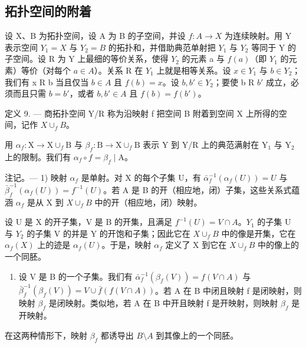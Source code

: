 \subsection{拓扑空间的附着}

设 X、B 为拓扑空间，设 A 为 B 的子空间，并设 \(f: A \rightarrow X\) 为连续映射。用 Y 表示空间 \(Y_{1} = X\) 与 \(Y_{2} = B\) 的拓扑和，并借助典范单射把 \(Y_{1}\) 与 \(Y_{2}\) 等同于 Y 的子空间。设 R 为 Y 上最细的等价关系，使得 \(Y_{2}\) 的元素 a 与 \(f(a)\)（即 \(Y_{1}\) 的元素）等价（对每个 \(a \in A\)）。关系 R 在 \(Y_{1}\) 上就是相等关系。设 \(x \in Y_{1}\) 与 \(b \in Y_{2}\)；我们有 x R b 当且仅当 \(b \in A\) 且 \(f(b) = x\)。设 \(b, b' \in Y_{2}\)；要使 b R \(b'\) 成立，必须而且只需 \(b = b'\)，或者 \(b, b' \in A\) 且 \(f(b) = f(b')\)。

定义 9. --- 商拓扑空间 Y/R 称为沿映射 f 把空间 B 附着到空间 X 上所得的空间，记作 \(X \cup_{f} B\)。

用 \(\alpha_{f}\colon\mathrm{X}\to\mathrm{X}\cup_{f}\mathrm{B}\) 与 \(\beta_{f}\colon\mathrm{B}\to\mathrm{X}\cup_{f}\mathrm{B}\) 表示 Y 到 Y/R 上的典范满射在 \(\mathrm{Y}_{1}\) 与 \(\mathrm{Y}_{2}\) 上的限制。我们有 \(\alpha_{f}\circ f=\beta_{f}\mid\mathrm{A}\)。

注记。--- 1) 映射 \(\alpha_{f}\) 是单射。对 X 的每个子集 U，有 \(\bar{\alpha}_{f}^{-1}(\alpha_{f}(U)) = U\) 与 \(\bar{\beta}_{f}^{-1}(\alpha_{f}(U)) = f^{-1}(U)\)。若 A 是 B 的开（相应地，闭）子集，这些关系式蕴涵 \(\alpha_{f}\) 是从 X 到 \(X \cup_{f} B\) 中的开（相应地，闭）映射。

设 U 是 X 的开子集，V 是 B 的开集，且满足 \(f^{-1}(U) = V \cap A\)。\(Y_{1}\) 的子集 U 与 \(Y_{2}\) 的子集 V 的并是 Y 的开饱和子集；因此它在 \(X \cup_{f} B\) 中的像是开集，它在 \(\alpha_{f}(X)\) 上的迹是 \(\alpha_{f}(U)\)。于是，映射 \(\alpha_{f}\) 定义了 X 到它在 \(X \cup_{f} B\) 中的像上的一个同胚。

\begin{enumerate}
\def\labelenumi{\arabic{enumi})}
\setcounter{enumi}{1}
\tightlist
\item
  设 V 是 B 的一个子集。我们有 \(\bar{\alpha}_{f}^{-1}(\beta_{f}(V)) = f(V \cap A)\) 与 \(\bar{\beta}_{f}^{-1}(\beta_{f}(V)) = V \cup \bar{f}(f(V \cap A))\)。若 A 在 B 中闭且映射 f 是闭映射，则映射 \(\beta_{f}\) 是闭映射。类似地，若 A 在 B 中开且映射 f 是开映射，则映射 \(\beta_{f}\) 是开映射。
\end{enumerate}

在这两种情形下，映射 \(\beta_{f}\) 都诱导出 \(B\setminus A\) 到其像上的一个同胚。

